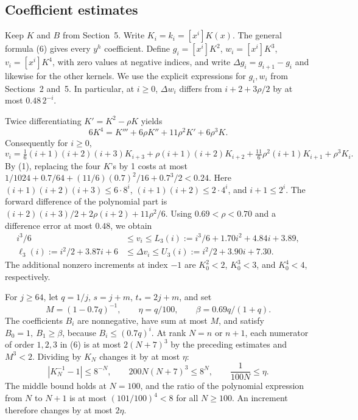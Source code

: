 \subsection{Coefficient estimates}

Keep \(K\) and \(B\) from Section~5. Write \(K_i=k_i=[x^i]K(x)\).
The general formula (6) gives every \(y^h\) coefficient. Define
\(g_i=[x^i]K^2\), \(w_i=[x^i]K^3\), \(v_i=[x^i]K^4\), with zero values
at negative indices, and write \(\Delta g_i=g_{i+1}-g_i\) and likewise
for the other kernels. We use the explicit expressions for \(g_i,w_i\)
from Sections~2 and~5. In particular, at
\(i\ge0\), \(\Delta w_i\) differs from \(i+2+3\rho/2\) by at most
\(0.48\,2^{-i}\).

Twice differentiating \(K'=K^2-\rho K\) yields
\[
 6K^4=K'''+6\rho K''+11\rho^2K'+6\rho^3K .
\]
Consequently for \(i\ge0\),
\[
 v_i=\tfrac16(i+1)(i+2)(i+3)K_{i+3}
      +\rho(i+1)(i+2)K_{i+2}
      +\tfrac{11}{6}\rho^2(i+1)K_{i+1}+\rho^3K_i.
\]
By (1), replacing the four \(K\)'s by 1 costs at most
\(1/1024+0.7/64+(11/6)(0.7)^2/16+0.7^3/2<0.24\).
Here \((i+1)(i+2)(i+3)\le6\cdot8^i\),
\((i+1)(i+2)\le2\cdot4^i\), and \(i+1\le2^i\).
The forward difference of the polynomial part is
\((i+2)(i+3)/2+2\rho(i+2)+11\rho^2/6\). Using \(0.69<\rho<0.70\)
and a difference error at most \(0.48\), we obtain
\begin{align*}
 i^3/6 &\le v_i\le L_3(i):=i^3/6+1.70i^2+4.84i+3.89,\\
 \ell_3(i):=i^2/2+3.87i+6 &\le \Delta v_i
                         \le U_3(i):=i^2/2+3.90i+7.30 .
\end{align*}
The additional nonzero increments at index \(-1\) are \(K_0^2<2\),
\(K_0^3<3\), and \(K_0^4<4\), respectively.

For \(j\ge64\), let \(q=1/j\), \(s=j+m\), \(t_*=2j+m\), and set
\[
 M=(1-0.7q)^{-1},\qquad \eta=q/100,\qquad
 \beta=0.69q/(1+q).
\]
The coefficients \(B_i\) are nonnegative, have sum at most \(M\), and
satisfy \(B_0=1,\ B_1\ge\beta\), because \(B_i\le (0.7q)^i\).
At rank \(N=n\) or \(n+1\), each numerator of order \(1,2,3\) in (6)
is at most \(2(N+7)^3\) by the preceding estimates
and \(M^3<2\). Dividing by \(K_N\) changes it by at most \(\eta\):
\[
 |K_N^{-1}-1|\le8^{-N},\qquad
 200N(N+7)^3\le8^N,\qquad \frac{1}{100N}\le\eta .
\]
The middle bound holds at \(N=100\), and the ratio of the polynomial
expression from \(N\) to \(N+1\) is at most \((101/100)^4<8\)
for all \(N\ge100\). An increment therefore changes by at most \(2\eta\).

